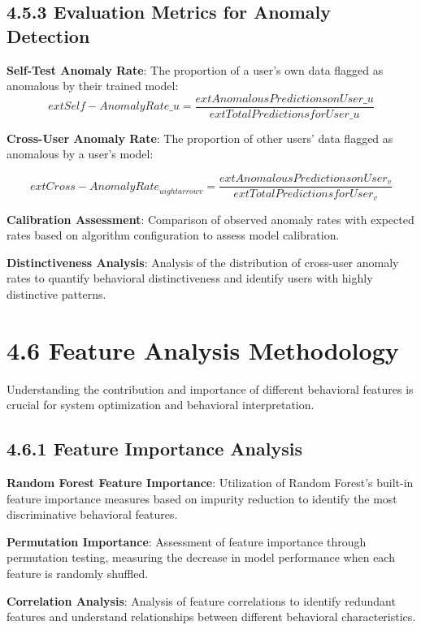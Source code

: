 \documentclass[
  12pt,
  a4paper,
]{report}
\begin{document}
\subsection{4.5.3 Evaluation Metrics for Anomaly
Detection}\label{evaluation-metrics-for-anomaly-detection}

\textbf{Self-Test Anomaly Rate}: The proportion of a user's own data
flagged as anomalous by their trained model:
\[ ext{Self-Anomaly Rate}\_u = \frac{ ext{Anomalous Predictions on User}\_u}{ ext{Total Predictions for User}\_u}\]

\textbf{Cross-User Anomaly Rate}: The proportion of other users' data
flagged as anomalous by a user's model:

\[
    ext{Cross-Anomaly Rate}_{u
ightarrow v} = \frac{   ext{Anomalous Predictions on User}_v}{  ext{Total Predictions for User}_v}
\]

\textbf{Calibration Assessment}: Comparison of observed anomaly rates
with expected rates based on algorithm configuration to assess model
calibration.

\textbf{Distinctiveness Analysis}: Analysis of the distribution of
cross-user anomaly rates to quantify behavioral distinctiveness and
identify users with highly distinctive patterns.

\section{4.6 Feature Analysis
Methodology}\label{feature-analysis-methodology}

Understanding the contribution and importance of different behavioral
features is crucial for system optimization and behavioral
interpretation.

\subsection{4.6.1 Feature Importance
Analysis}\label{feature-importance-analysis}

\textbf{Random Forest Feature Importance}: Utilization of Random
Forest's built-in feature importance measures based on impurity
reduction to identify the most discriminative behavioral features.

\textbf{Permutation Importance}: Assessment of feature importance
through permutation testing, measuring the decrease in model performance
when each feature is randomly shuffled.

\textbf{Correlation Analysis}: Analysis of feature correlations to
identify redundant features and understand relationships between
different behavioral characteristics.
\end{document}
